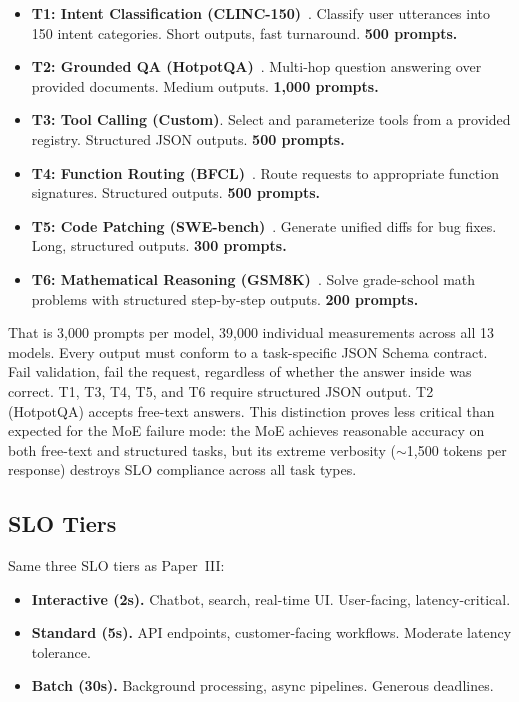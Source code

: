 \documentclass[11pt]{article}
\begin{document}
\begin{itemize}[leftmargin=12pt]
    \item \textbf{T1: Intent Classification (CLINC-150)}~\citep{larson2019clinc}.  Classify user utterances into 150 intent categories.  Short outputs, fast turnaround.  \textbf{500 prompts.}
    \item \textbf{T2: Grounded QA (HotpotQA)}~\citep{yang2018hotpotqa}.  Multi-hop question answering over provided documents.  Medium outputs.  \textbf{1,000 prompts.}
    \item \textbf{T3: Tool Calling (Custom)}.  Select and parameterize tools from a provided registry.  Structured JSON outputs.  \textbf{500 prompts.}
    \item \textbf{T4: Function Routing (BFCL)}~\citep{berkeley2024bfcl, patil2023gorilla}.  Route requests to appropriate function signatures.  Structured outputs.  \textbf{500 prompts.}
    \item \textbf{T5: Code Patching (SWE-bench)}~\citep{jimenez2024swebench}.  Generate unified diffs for bug fixes.  Long, structured outputs.  \textbf{300 prompts.}
    \item \textbf{T6: Mathematical Reasoning (GSM8K)}~\citep{cobbe2021gsm8k}.  Solve grade-school math problems with structured step-by-step outputs.  \textbf{200 prompts.}
\end{itemize}

That is 3,000 prompts per model, 39,000 individual measurements across all 13 models.  Every output must conform to a task-specific JSON Schema contract.  Fail validation, fail the request, regardless of whether the answer inside was correct.  T1, T3, T4, T5, and T6 require structured JSON output.  T2 (HotpotQA) accepts free-text answers.  This distinction proves less critical than expected for the MoE failure mode: the MoE achieves reasonable accuracy on both free-text and structured tasks, but its extreme verbosity (${\sim}$1,500 tokens per response) destroys SLO compliance across all task types.

\subsection{SLO Tiers}
\label{sec:slo-tiers}

Same three SLO tiers as Paper~III:

\begin{itemize}[leftmargin=12pt]
    \item \textbf{Interactive (2s).} Chatbot, search, real-time UI.  User-facing, latency-critical.
    \item \textbf{Standard (5s).} API endpoints, customer-facing workflows.  Moderate latency tolerance.
    \item \textbf{Batch (30s).} Background processing, async pipelines.  Generous deadlines.
\end{itemize}
\end{document}
